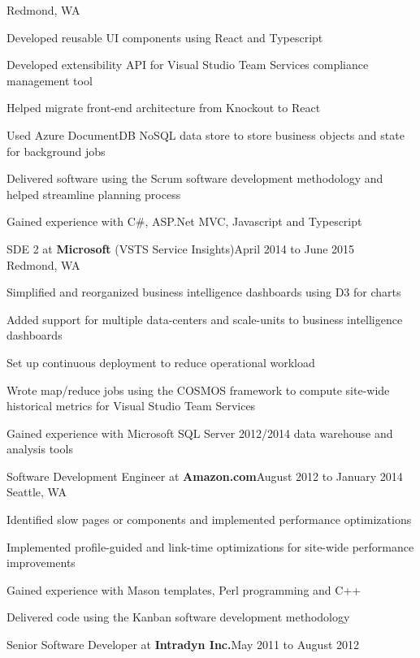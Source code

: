 \documentclass[letterpaper]{article}
\newenvironment{resume-list}
{\begin{itemize}
 \setlength{\itemsep}{0pt}
 \setlength{\parskip}{0pt}}
{\end{itemize}}
\begin{document}
Redmond, WA
\begin{resume-list}
\item Developed reusable UI components using React and Typescript
\item Developed extensibility API for Visual Studio Team Services compliance management tool
\item Helped migrate front-end architecture from Knockout to React
\item Used Azure DocumentDB NoSQL data store to store business objects and state for background jobs
\item Delivered software using the Scrum software development methodology and helped streamline planning process
\item Gained experience with C\#, ASP.Net MVC, Javascript and Typescript
\end{resume-list}
\noindent SDE 2 at {\bfseries Microsoft} (VSTS Service Insights)\dotfill April 2014 to June 2015\\
Redmond, WA
\begin{resume-list}
\item Simplified and reorganized business intelligence dashboards using D3 for charts
\item Added support for multiple data-centers and scale-units to business intelligence dashboards
\item Set up continuous deployment to reduce operational workload
\item Wrote map/reduce jobs using the COSMOS framework to compute site-wide historical metrics for Visual Studio Team Services
\item Gained experience with Microsoft SQL Server 2012/2014 data warehouse and analysis tools
\end{resume-list}
\noindent Software Development Engineer at {\bfseries Amazon.com}\dotfill August 2012 to January 2014\\
Seattle, WA
\begin{resume-list}
\item Identified slow pages or components and implemented performance optimizations
\item Implemented profile-guided and link-time optimizations for site-wide performance improvements
\item Gained experience with Mason templates, Perl programming and C++
\item Delivered code using the Kanban software development methodology
\end{resume-list}
\noindent Senior Software Developer at {\bfseries Intradyn Inc.}\dotfill May 2011 to August 2012\\
\end{document}
